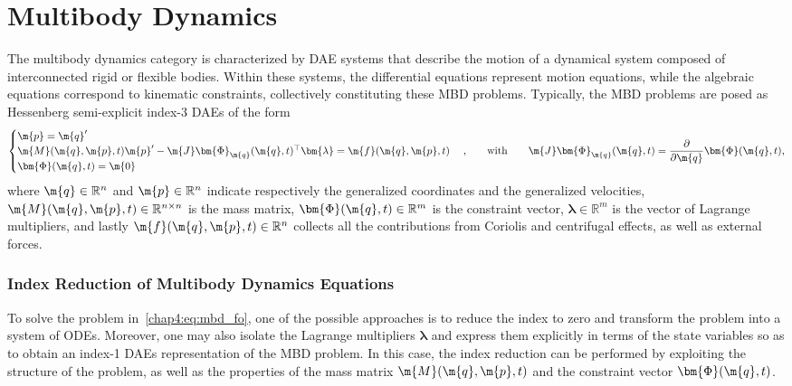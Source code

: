 \section{Multibody Dynamics}
\label{chap4:sec:mbd}

The multibody dynamics category is characterized by \ac{DAE} systems that describe the motion of a dynamical system composed of interconnected rigid or flexible bodies. Within these systems, the differential equations represent motion equations, while the algebraic equations correspond to kinematic constraints, collectively constituting these \ac{MBD} problems. Typically, the \ac{MBD} problems are posed as Hessenberg semi-explicit index-3 \acp{DAE} of the form
%
\begin{equation}
  \begin{cases}
    \m{p} = \m{q}^{\prime} \\
    \m{M}(\m{q}, \m{p}, t)\m{p}^{\prime} - \m{J}\bm{\Phi}_{\m{q}}(\m{q}, t)^{\top}\bm{\lambda} = \m{f}(\m{q}, \m{p} ,t) \\
    \bm{\Phi}(\m{q}, t) = \m{0}
  \end{cases} \text{,}
  \qquad \text{with} \qquad \m{J}\bm{\Phi}_{\m{q}}(\m{q}, t) = \dfrac{\partial}{\partial\m{q}}\bm{\Phi}(\m{q}, t)
  \text{,}
  \label{chap4:eq:mbd_fo}
\end{equation}
%
where $\m{q} \in \mathbb{R}^{n}$ and $\m{p} \in \mathbb{R}^{n}$ indicate respectively the generalized coordinates and the generalized velocities, $\m{M}(\m{q}, \m{p}, t) \in \mathbb{R}^{n\times n}$ is the mass matrix, $\bm{\Phi}(\m{q}, t) \in \mathbb{R}^{m}$ is the constraint vector, $\bm{\lambda} \in \mathbb{R}^{m}$ is the vector of Lagrange multipliers, and lastly $\m{f}(\m{q}, \m{p}, t) \in \mathbb{R}^{n}$ collects all the contributions from Coriolis and centrifugal effects, as well as external forces.

\subsubsection{Index Reduction of Multibody Dynamics Equations}

To solve the problem in~\eqref{chap4:eq:mbd_fo}, one of the possible approaches is to reduce the index to zero and transform the problem into a system of \acp{ODE}. Moreover, one may also isolate the Lagrange multipliers $\bm{\lambda}$ and express them explicitly in terms of the state variables so as to obtain an index-1 \acp{DAE} representation of the \ac{MBD} problem. In this case, the index reduction can be performed by exploiting the structure of the problem, as well as the properties of the mass matrix $\m{M}(\m{q}, \m{p}, t)$ and the constraint vector $\bm{\Phi}(\m{q}, t)$.

